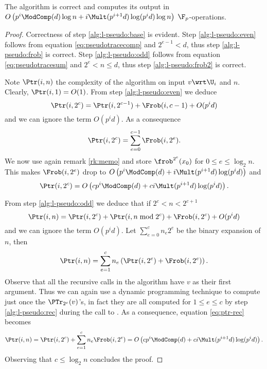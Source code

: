 \sloppy
\begin{theorem}
  \label{th:l-pseudo}
  The algorithm  is correct and computes its
  output in $O\left(p^i\ModComp(d)\log n +
  i\Mult(p^{i+1}d)\log(p^id)\log n\right)$ $\F_p$-operations.
\end{theorem}
\fussy
\begin{proof}
  Correctness of step \ref{alg:l-pseudo:base} is evident. Step
  \ref{alg:l-pseudo:even} follows from equation
  \eqref{eq:pseudotracecomp} and $2^{e-1}<d$, thus step
  \ref{alg:l-pseudo:frob} is correct. Step \ref{alg:l-pseudo:odd}
  follows from equation \eqref{eq:pseudotracesum} and $2^e<n\le d$,
  thus step \ref{alg:l-pseudo:frob2} is correct.

  Note $\Ptr(i,n)$ the complexity of the algorithm on input
  $v\wrt\U_i$ and $n$. Clearly, $\Ptr(i,1)=O(1)$. From step
  \ref{alg:l-pseudo:even} we deduce
  \[\Ptr(i,2^c) = \Ptr(i,2^{c-1}) + \Frob(i,c-1) + O(p^id)\]
  and we can ignore the term $O(p^id)$. As a consequence
  \begin{equation*}
    \Ptr(i,2^c) = \sum_{e=0}^{c-1} \Frob(i,2^e).
  \end{equation*}
  We now use again remark \ref{rk:memo} and store $\frob^{2^e}(x_0)$
  for $0\le e\le\log_2n$. This makes $\Frob(i,2^e)$ drop to
  $O\left(p^i\ModComp(d) + i\Mult(p^{i+1}d)\log(p^id)\right)$ and
  \begin{equation*}
    \Ptr(i,2^c) = O\left(cp^i\ModComp(d) +
    ci\Mult(p^{i+1}d)\log(p^id)\right) .
  \end{equation*}

  From step \ref{alg:l-pseudo:odd} we deduce that if $2^c<n<2^{c+1}$
  \begin{equation*}
    \Ptr(i,n) =
    \Ptr(i, 2^c) + \Ptr(i, n\bmod 2^c) + \Frob(i, 2^c) + O(p^id)
  \end{equation*}
  and we can ignore the term $O(p^id)$. Let $\sum_{e=0}^cn_e2^e$ be
  the binary expansion of $n$, then
  \begin{equation}
    \label{eq:ptr-rec}
    \Ptr(i,n) = \sum_{e=1}^c n_e\left(\Ptr(i, 2^e) + \Frob(i,2^e)\right)
    .
  \end{equation}
  Observe that all the recursive calls in the algorithm have $v$ as
  their first argument. Thus we can again use a dynamic programming
  technique to compute just once the $\PTr_{2^e}(v)$'s, in fact they
  are all computed for $1\le e \le c$ by step \ref{alg:l-pseudo:rec}
  during the call to . As a
  consequence, equation \eqref{eq:ptr-rec} becomes
  \begin{equation*}
    \Ptr(i,n) = \Ptr(i, 2^c) + \sum_{e=1}^c n_e\Frob(i,2^e) =
    O\left(cp^i\ModComp(d) + ci\Mult(p^{i+1}d)\log(p^id)\right)
    .
  \end{equation*}
  Observing that $c\le\log_2n$ concludes the proof.
\end{proof}

